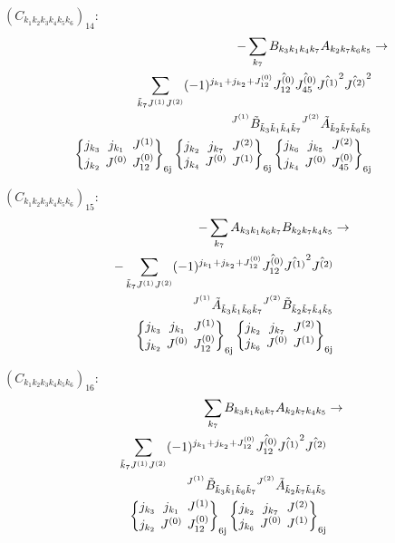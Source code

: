 \documentclass[11pt]{article}
\newcommand{\sixj}[6]{\begingroup\setlength{\arraycolsep}{0.2em}\begin{Bmatrix} #1 & #2 & #3 \\ #4 & #5 & #6 \end{Bmatrix}_{\text{6j}}\endgroup}
\begin{document}
$\left({C}_{{k}_{1}{k}_{2}{k}_{3}{k}_{4}{k}_{5}{k}_{6}}\right)_{14}$:
\begin{align}
-\sum_{{k}_{7}}{B}_{{k}_{3}{k}_{1}{k}_{4}{k}_{7}}{A}_{{k}_{2}{k}_{7}{k}_{6}{k}_{5}}&\rightarrow \notag \\\sum_{\tilde{k}_{7}J^{(1)}J^{(2)}}(-1)^{j_{{k}_{1}} +j_{{k}_{2}} +J^{(0)}_{12} }\hat{J^{(0)}_{12}}\hat{J^{(0)}_{45}}\hat{J^{(1)}}^{2}\hat{J^{(2)}}^{2}& \notag \\{}^{J^{(1)}}\tilde{B}_{\tilde{k}_{3}\tilde{k}_{1}\tilde{k}_{4}\tilde{k}_{7}}{}^{J^{(2)}}\tilde{A}_{\tilde{k}_{2}\tilde{k}_{7}\tilde{k}_{6}\tilde{k}_{5}}& \notag \\\sixj{j_{{k}_{3}}}{j_{{k}_{1}}}{J^{(1)}}{j_{{k}_{2}}}{J^{(0)}}{J^{(0)}_{12}}\sixj{j_{{k}_{2}}}{j_{{k}_{7}}}{J^{(2)}}{j_{{k}_{4}}}{J^{(0)}}{J^{(1)}}\sixj{j_{{k}_{6}}}{j_{{k}_{5}}}{J^{(2)}}{j_{{k}_{4}}}{J^{(0)}}{J^{(0)}_{45}}
\end{align}

$\left({C}_{{k}_{1}{k}_{2}{k}_{3}{k}_{4}{k}_{5}{k}_{6}}\right)_{15}$:
\begin{align}
-\sum_{{k}_{7}}{A}_{{k}_{3}{k}_{1}{k}_{6}{k}_{7}}{B}_{{k}_{2}{k}_{7}{k}_{4}{k}_{5}}&\rightarrow \notag \\-\sum_{\tilde{k}_{7}J^{(1)}J^{(2)}}(-1)^{j_{{k}_{1}} +j_{{k}_{2}} +J^{(0)}_{12} }\hat{J^{(0)}_{12}}\hat{J^{(1)}}^{2}\hat{J^{(2)}}& \notag \\{}^{J^{(1)}}\tilde{A}_{\tilde{k}_{3}\tilde{k}_{1}\tilde{k}_{6}\tilde{k}_{7}}{}^{J^{(2)}}\tilde{B}_{\tilde{k}_{2}\tilde{k}_{7}\tilde{k}_{4}\tilde{k}_{5}}& \notag \\\sixj{j_{{k}_{3}}}{j_{{k}_{1}}}{J^{(1)}}{j_{{k}_{2}}}{J^{(0)}}{J^{(0)}_{12}}\sixj{j_{{k}_{2}}}{j_{{k}_{7}}}{J^{(2)}}{j_{{k}_{6}}}{J^{(0)}}{J^{(1)}}
\end{align}

$\left({C}_{{k}_{1}{k}_{2}{k}_{3}{k}_{4}{k}_{5}{k}_{6}}\right)_{16}$:
\begin{align}
\sum_{{k}_{7}}{B}_{{k}_{3}{k}_{1}{k}_{6}{k}_{7}}{A}_{{k}_{2}{k}_{7}{k}_{4}{k}_{5}}&\rightarrow \notag \\\sum_{\tilde{k}_{7}J^{(1)}J^{(2)}}(-1)^{j_{{k}_{1}} +j_{{k}_{2}} +J^{(0)}_{12} }\hat{J^{(0)}_{12}}\hat{J^{(1)}}^{2}\hat{J^{(2)}}& \notag \\{}^{J^{(1)}}\tilde{B}_{\tilde{k}_{3}\tilde{k}_{1}\tilde{k}_{6}\tilde{k}_{7}}{}^{J^{(2)}}\tilde{A}_{\tilde{k}_{2}\tilde{k}_{7}\tilde{k}_{4}\tilde{k}_{5}}& \notag \\\sixj{j_{{k}_{3}}}{j_{{k}_{1}}}{J^{(1)}}{j_{{k}_{2}}}{J^{(0)}}{J^{(0)}_{12}}\sixj{j_{{k}_{2}}}{j_{{k}_{7}}}{J^{(2)}}{j_{{k}_{6}}}{J^{(0)}}{J^{(1)}}
\end{align}
\end{document}
